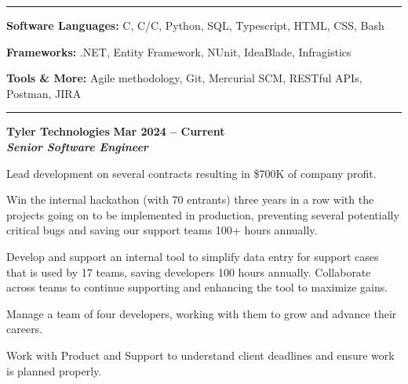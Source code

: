 \documentclass[10pt]{article}
\newcommand{\thing}[1][]{\item #1}
\newcommand{\sectionheader}[1]{
    \vspace{3pt}
    \StrSplit{#1}{3}{\firstpart}{\lastpart} %

    \makebox[0pt][l]{\textbf{\LARGE\firstpart\lastpart}}%
    \rule[-1ex]{\columnwidth}{.1pt}

}
\newcommand{\dates}[2]{
    \textbf{#1 -- #2}
}
\newcommand{\+}{\raisebox{0.2ex}{+}} %
\newcommand{\gt}{\raisebox{0.1ex}{\textgreater}} %
\newcommand{\hash}{\raisebox{0.3ex}{\#}} %
\begin{document}

    \sectionheader{Skills}
    \begin{things}
        \thing \textbf{Software Languages:} C\hash, C/C\+\+,
                Python, SQL, Typescript, HTML, CSS, Bash
        \thing \textbf{Frameworks:} .NET, Entity Framework, NUnit, IdeaBlade, Infragistics
        \thing \textbf{Tools \& More:} Agile methodology, Git,
                Mercurial SCM, RESTful APIs, Postman, JIRA
    \end{things}
    \vspace{-13pt}
    
    \sectionheader{Experience}
    \textbf{\large Tyler Technologies} \hfill \dates{Mar 2024}{Current}\\
    \textit{\textbf{Senior Software Engineer}}
    \begin{things}
        \thing Lead development on several contracts resulting in
                \gt\$700K of company profit.
        \thing Win the internal hackathon (with \gt70 entrants) three years in a row
                    with the projects going on to be implemented in production,
                    preventing several potentially critical bugs and saving our support
                    teams 100+ hours annually.
        \thing Develop and support an internal tool to simplify data entry for support cases that is
                    used by 17 teams, saving developers \gt100 hours annually. Collaborate
                    across teams to continue supporting and enhancing the tool to maximize gains.
        \thing Manage a team of four developers, working with them to grow and advance
                    their careers.
        \thing Work with Product and Support to understand client deadlines
                    and ensure work is planned properly.
    \end{things}
\end{document}
